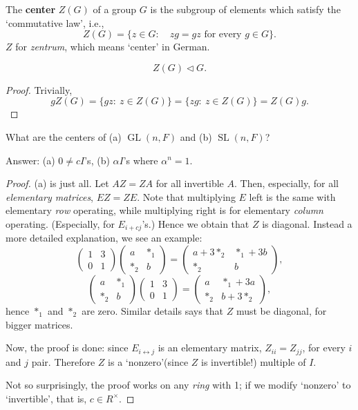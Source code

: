 \begin{defn}[center] The \textbf{center} $Z(G)$ of a group $G$ is the subgroup of elements which satisfy the `commutative law', i.e., $$Z(G) = \{z\in G: \quad zg = gz \textrm{ for every }g\in G\}.$$ $Z$ for \textit{zentrum}, which means `center' in German.
\end{defn}
\begin{prop}
$$Z(G)\triangleleft G.$$
\end{prop}
\begin{proof}
Trivially, $$gZ(G) = \{gz:~z\in Z(G)\} = \{zg:~z \in Z(G)\} = Z(G)g.$$
\end{proof}
\begin{ex}
What are the centers of (a) $\operatorname{GL}(n, F)$ and (b) $\operatorname{SL}(n, F)$?

Answer: (a) $0\ne cI$'s, (b) $\alpha I$'s where $\alpha^n = 1.$
\end{ex}
\begin{proof}
(a) is just all. Let $AZ = ZA$ for all invertible $A.$ Then, especially, for all \textit{elementary matrices}, $EZ = ZE.$ Note that multiplying $E$ left is the same with elementary \textit{row} operating, while multiplying right is for elementary \textit{column} operating. (Especially, for $E_{i + cj}$'s.) Hence we obtain that $Z$ is diagonal. Instead a more detailed explanation, we see an example: $$
\begin{pmatrix}
1 & 3 \\
0 & 1
\end{pmatrix}
\begin{pmatrix}
a & *_1 \\
*_2 & b
\end{pmatrix}
=
\begin{pmatrix}
a + 3*_2 & *_1 + 3b \\
*_2 & b
\end{pmatrix},$$
$$\begin{pmatrix}
a & *_1 \\
*_2 & b
\end{pmatrix}
\begin{pmatrix}
1 & 3 \\
0 & 1
\end{pmatrix}
=
\begin{pmatrix}
a  & *_1 + 3a \\
*_2 & b + 3*_2
\end{pmatrix},$$
hence $*_1$ and $*_2$ are zero. Similar details says that $Z$ must be diagonal, for bigger matrices.

Now, the proof is done: since $E_{i\leftrightarrow j}$ is an elementary matrix, $Z_{ii} = Z_{jj}$, for every $i$ and $j$ pair. Therefore $Z$ is a `nonzero'(since $Z$ is invertible!) multiple of $I.$

Not so surprisingly, the proof works on any \textit{ring} with 1; if we modify `nonzero' to `invertible', that is, $c\in R^{\times}.$
\end{proof}
